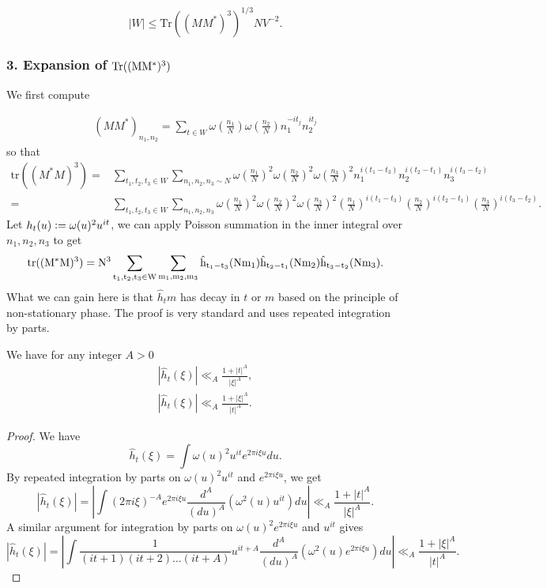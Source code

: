 \begin{equation}
    \label{traceineq}
    |W|\leq \textrm{Tr}((MM^*)^3)^{1/3} NV^{-2}.
\end{equation}

\subsubsection*{3. Expansion of $\rm{Tr}((MM^*)^3)$}
We first compute 

\begin{align*}
    (MM^*)_{n_1,n_2} = \sum_{t\in W} \omega\left(\frac{n_1}{N}\right)\omega\left(\frac{n_2}{N}\right)
    n_1^{-it_j}n_2^{it_j}
\end{align*}
so that\begin{align*}
    \textrm{tr}((M^*M)^3)=& \sum_{t_1,t_2,t_3\in W}\sum_{n_1,n_2,n_3\sim N} 
    \omega\left(\frac{n_1}{N}\right)^2\omega\left(\frac{n_2}{N}\right)^2\omega\left(\frac{n_3}{N}\right)^2 n_1^{i(t_1-t_3)}
   n_2^{i(t_2-t_1)}
    n_3^{i(t_3-t_2)}\\=& \sum_{t_1,t_2,t_3\in W}\sum_{n_1,n_2,n_3} 
    \omega\left(\frac{n_1}{N}\right)^2\omega\left(\frac{n_2}{N}\right)^2\omega\left(\frac{n_3}{N}\right)^2 \left(\frac{n_1}{N}\right)^{i(t_1-t_3)}
    \left(\frac{n_2}{N}\right)^{i(t_2-t_1)}
    \left(\frac{n_3}{N}\right)^{i(t_3-t_2)}.
\end{align*}
Let $h_t(u)\mathrel{\mathop:}= \omega(u)^2 u^{it}$, we can apply Poisson summation in the inner integral over $n_1,n_2,n_3$ to get 
\begin{equation}\label{poissongm}
    \rm{tr}((M^*M)^3)= N^3\sum_{t_1,t_2,t_3\in W}\sum_{m_1,m_2,m_3}  \hat{h}_{t_1-t_3}(Nm_1)\hat{h}_{t_2-t_1}(Nm_2)\hat{h}_{t_3-t_2}(Nm_3).
\end{equation}
What we can gain here is that $\hat{h}_t{m}$ has decay in $t$ or $m$ based on the principle of non-stationary phase. The proof is very standard and uses repeated integration by parts.
\begin{lemma}
    \label{nonstationary}
    We have for any integer $A>0$\begin{align*}
        |\hat{h}_t(\xi)|\ll_A \frac{1+|t|^A}{|\xi|^A},\\
        |\hat{h}_t(\xi)|\ll_A \frac{1+|\xi|^A}{|t|^A}. 
    \end{align*}
\end{lemma}
\begin{proof}
   We have \[
   \hat{h}_t(\xi)=\int \omega(u)^2u^{it}e^{2\pi i \xi u} du.\]
   By repeated integration by parts on $\omega(u)^2u^{it}$ and $e^{2\pi i \xi u}$, we get \[
    |\hat{h}_t(\xi)|=\left|\int (2\pi i \xi)^{-A} e^{2\pi i \xi u}  \frac{d^A}{(du)^A}\left(\omega^2(u)u^{it}\right) du\right| \ll_A \frac{1+|t|^A}{|\xi|^A}.
   \]
   A similar argument for integration by parts on $\omega(u)^2e^{2\pi i \xi u}$ and $u^{it}$ gives \[
    |\hat{h}_t(\xi)|=\left|\int \frac{1}{(it+1)(it+2)\ldots(it+A)}u^{it+A}  \frac{d^A}{(du)^A}\left(\omega^2(u)e^{2\pi i \xi u}\right) du \right|\ll_A \frac{1+|\xi|^A}{|t|^A}.
   \]
\end{proof}
